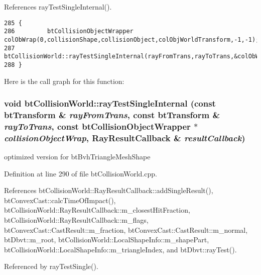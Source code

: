 References rayTestSingleInternal().

\begin{Code}\begin{verbatim}285 {
286         btCollisionObjectWrapper colObWrap(0,collisionShape,collisionObject,colObjWorldTransform,-1,-1);
287         btCollisionWorld::rayTestSingleInternal(rayFromTrans,rayToTrans,&colObWrap,resultCallback);
288 }
\end{verbatim}
\end{Code}




Here is the call graph for this function:\hypertarget{classbt_collision_world_84bbeea09de9dc5c68e49826e58f7114}{
\subsubsection[rayTestSingleInternal]{\setlength{\rightskip}{0pt plus 5cm}void btCollisionWorld::rayTestSingleInternal (const btTransform \& {\em rayFromTrans}, \/  const btTransform \& {\em rayToTrans}, \/  const btCollisionObjectWrapper $\ast$ {\em collisionObjectWrap}, \/  {\bf RayResultCallback} \& {\em resultCallback})}}
\label{classbt_collision_world_84bbeea09de9dc5c68e49826e58f7114}




optimized version for btBvhTriangleMeshShape 

Definition at line 290 of file btCollisionWorld.cpp.

References btCollisionWorld::RayResultCallback::addSingleResult(), btConvexCast::calcTimeOfImpact(), btCollisionWorld::RayResultCallback::m\_\-closestHitFraction, btCollisionWorld::RayResultCallback::m\_\-flags, btConvexCast::CastResult::m\_\-fraction, btConvexCast::CastResult::m\_\-normal, btDbvt::m\_\-root, btCollisionWorld::LocalShapeInfo::m\_\-shapePart, btCollisionWorld::LocalShapeInfo::m\_\-triangleIndex, and btDbvt::rayTest().

Referenced by rayTestSingle().

